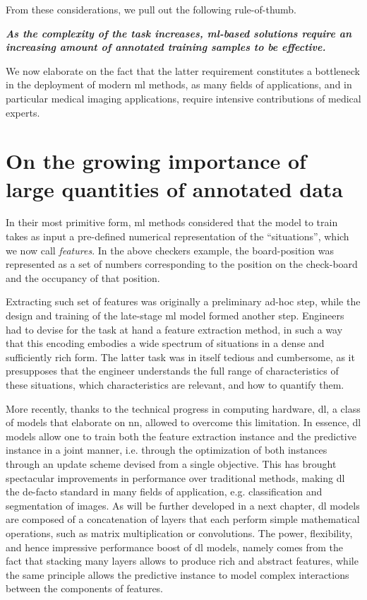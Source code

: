 From these considerations, we pull out the following rule-of-thumb.

\textbf{\textit{As the complexity of the task increases, \gls{ml}-based solutions require an increasing amount of annotated training samples to be effective.}}

We now elaborate on the fact that the latter requirement constitutes a bottleneck in the deployment of modern \gls{ml} methods, as many fields of applications, and in particular medical imaging applications, require intensive contributions of medical experts.

\section{On the growing importance of large quantities of annotated data}
In their most primitive form, \gls{ml} methods considered that the model to train takes as input a pre-defined numerical representation of the ``situations'', which we now call \textit{features}.
In the above checkers example, the board-position was represented as a set of numbers corresponding to the position on the check-board and the occupancy of that position.

Extracting such set of features was originally a preliminary ad-hoc step, while the design and training of the late-stage \gls{ml} model formed another step.
Engineers had to devise for the task at hand a feature extraction method, in such a way that this encoding embodies a wide spectrum of situations in a dense and sufficiently rich form.
The latter task was in itself tedious and cumbersome, as it presupposes that the engineer understands the full range of characteristics of these situations, which characteristics are relevant, and how to quantify them.

More recently, thanks to the technical progress in computing hardware, \gls{dl}, a class of models that elaborate on \gls{nn}, allowed to overcome this limitation.
In essence, \gls{dl} models allow one to train both the feature extraction instance and the predictive instance in a joint manner, i.e. through the optimization of both instances through an update scheme devised from a single objective.
This has brought spectacular improvements in performance over traditional methods, making \gls{dl} the de-facto standard in many fields of application, e.g. classification and segmentation of images.
As will be further developed in a next chapter, \gls{dl} models are composed of a concatenation of layers that each perform simple mathematical operations, such as matrix multiplication or convolutions.
The power, flexibility, and hence impressive performance boost of \gls{dl} models, namely comes from the fact that stacking many layers allows to produce rich and abstract features, while the same principle allows the predictive instance to model complex interactions between the components of features.

